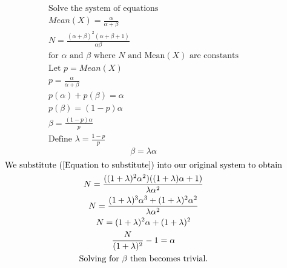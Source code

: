 \documentclass{article}
\begin{document}
\begin{gather*}
\text{Solve the system of equations}\\
Mean(X) = \frac{\alpha}{\alpha + \beta}\\
N = \frac{(\alpha + \beta)^2 (\alpha + \beta +1)}{\alpha \beta}\\
\text{for $\alpha$ and $\beta$ where $N$ and Mean$(X)$ are constants}\\
\text{Let $p = Mean(X)$}\\
p = \frac{\alpha}{\alpha+ \beta}\\
p(\alpha) + p(\beta) = \alpha\\
p(\beta) = (1-p)\alpha\\
\beta = \frac{(1-p)\alpha}{p}\\
\text{Define $\lambda = \frac{1-p}{p}$}
\end{gather*}
\begin{equation}\label{Equation to substitute}
\beta = \lambda \alpha
\end{equation}
\begin{gather*}
\text{We substitute (\ref{Equation to substitute}) into our original system to obtain}\\
N = \frac{((1+\lambda)^2\alpha^2)((1+\lambda)\alpha + 1)}{\lambda \alpha^2}\\
N = \frac{(1+\lambda)^3\alpha^3 + (1+\lambda)^2\alpha^2}{\lambda \alpha^2}\\
N = (1+ \lambda)^2 \alpha + (1+\lambda)^2\\
\frac{N}{(1+\lambda)^2}-1 = \alpha\\
\text{Solving for $\beta$ then becomes trivial.}
\end{gather*}

 
\end{document}
